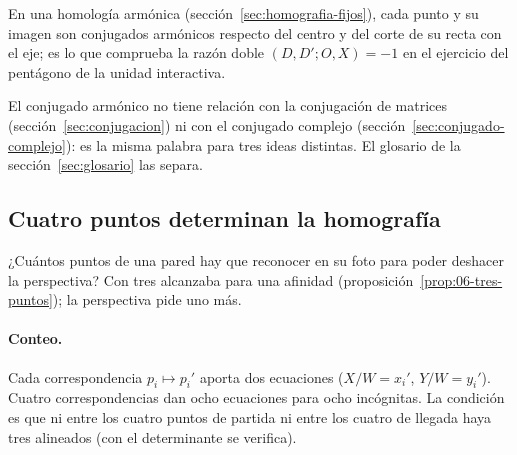En una homología armónica (sección~\ref{sec:homografia-fijos}), cada punto y su imagen son
conjugados armónicos respecto del centro y del corte de su recta con el eje; es lo que
comprueba la razón doble \((D,D';O,X)=-1\) en el ejercicio del pentágono de la unidad
interactiva.

\begin{atencion}
El conjugado armónico no tiene relación con la conjugación de matrices
(sección~\ref{sec:conjugacion}) ni con el conjugado complejo
(sección~\ref{sec:conjugado-complejo}): es la misma palabra para tres ideas distintas. El
glosario de la sección~\ref{sec:glosario} las separa.
\end{atencion}

\subsection{Cuatro puntos determinan la homografía}\label{sec:cuatro-puntos}

¿Cuántos puntos de una pared hay que reconocer en su foto para poder deshacer la perspectiva?
Con tres alcanzaba para una afinidad (proposición~\ref{prop:06-tres-puntos}); la perspectiva pide
uno más.

\paragraph{Conteo.} Cada correspondencia \(p_i\mapsto p_i'\) aporta dos ecuaciones
(\(X/W=x_i'\), \(Y/W=y_i'\)). Cuatro correspondencias dan ocho ecuaciones para ocho
incógnitas. La condición es que ni entre los cuatro puntos de partida ni entre los cuatro de
llegada haya tres alineados (con el determinante se verifica).

